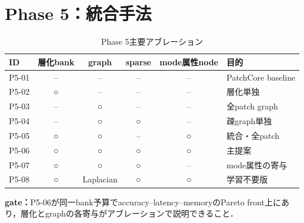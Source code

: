 \documentclass[a4paper,11pt]{ltjsarticle}
\begin{document}
\section{Phase 5：統合手法}
\begin{table}[H]
\centering\small
\caption{Phase 5主要アブレーション}
\begin{tabular}{lccccl}
\toprule
ID & 層化bank & graph & sparse & mode属性node & 目的 \\
\midrule
P5-01 & -- & -- & -- & -- & PatchCore baseline \\
P5-02 & ○ & -- & -- & -- & 層化単独 \\
P5-03 & -- & ○ & -- & -- & 全patch graph \\
P5-04 & -- & ○ & ○ & -- & 疎graph単独 \\
P5-05 & ○ & ○ & -- & ○ & 統合・全patch \\
P5-06 & ○ & ○ & ○ & ○ & 主提案 \\
P5-07 & ○ & ○ & ○ & -- & mode属性の寄与 \\
P5-08 & ○ & Laplacian & ○ & ○ & 学習不要版 \\
\bottomrule
\end{tabular}
\end{table}
\textbf{gate：}P5-06が同一bank予算でaccuracy--latency--memoryのPareto front上にあり，層化とgraphの各寄与がアブレーションで説明できること．
\end{document}
